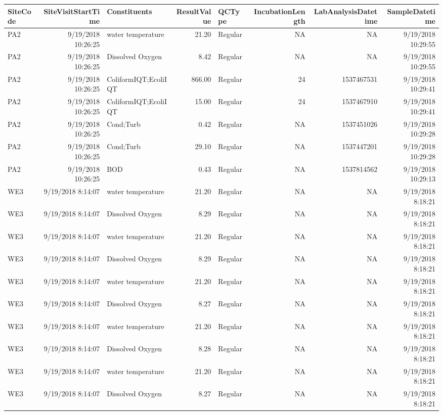 \documentclass[
  letterpaper,
  DIV=11,
  numbers=noendperiod]{scrartcl}
\begin{document}
\begin{longtable*}{lrlrlrrr}
\toprule
SiteCode & SiteVisitStartTime & Constituents & ResultValue & QCType & IncubationLength & LabAnalysisDatetime & SampleDatetime \\ 
\midrule\addlinespace[2.5pt]
PA2 & 9/19/2018 10:26:25 & water temperature & 21.20 & Regular & NA & NA & 9/19/2018 10:29:55 \\ 
PA2 & 9/19/2018 10:26:25 & Dissolved Oxygen & 8.42 & Regular & NA & NA & 9/19/2018 10:29:55 \\ 
PA2 & 9/19/2018 10:26:25 & ColiformIQT;EcoliIQT & 866.00 & Regular & 24 & 1537467531 & 9/19/2018 10:29:41 \\ 
PA2 & 9/19/2018 10:26:25 & ColiformIQT;EcoliIQT & 15.00 & Regular & 24 & 1537467910 & 9/19/2018 10:29:41 \\ 
PA2 & 9/19/2018 10:26:25 & Cond;Turb & 0.42 & Regular & NA & 1537451026 & 9/19/2018 10:29:28 \\ 
PA2 & 9/19/2018 10:26:25 & Cond;Turb & 29.10 & Regular & NA & 1537447201 & 9/19/2018 10:29:28 \\ 
PA2 & 9/19/2018 10:26:25 & BOD & 0.43 & Regular & NA & 1537814562 & 9/19/2018 10:29:13 \\ 
WE3 & 9/19/2018 8:14:07 & water temperature & 21.20 & Regular & NA & NA & 9/19/2018 8:18:21 \\ 
WE3 & 9/19/2018 8:14:07 & Dissolved Oxygen & 8.29 & Regular & NA & NA & 9/19/2018 8:18:21 \\ 
WE3 & 9/19/2018 8:14:07 & water temperature & 21.20 & Regular & NA & NA & 9/19/2018 8:18:21 \\ 
WE3 & 9/19/2018 8:14:07 & Dissolved Oxygen & 8.29 & Regular & NA & NA & 9/19/2018 8:18:21 \\ 
WE3 & 9/19/2018 8:14:07 & water temperature & 21.20 & Regular & NA & NA & 9/19/2018 8:18:21 \\ 
WE3 & 9/19/2018 8:14:07 & Dissolved Oxygen & 8.27 & Regular & NA & NA & 9/19/2018 8:18:21 \\ 
WE3 & 9/19/2018 8:14:07 & water temperature & 21.20 & Regular & NA & NA & 9/19/2018 8:18:21 \\ 
WE3 & 9/19/2018 8:14:07 & Dissolved Oxygen & 8.28 & Regular & NA & NA & 9/19/2018 8:18:21 \\ 
WE3 & 9/19/2018 8:14:07 & water temperature & 21.20 & Regular & NA & NA & 9/19/2018 8:18:21 \\ 
WE3 & 9/19/2018 8:14:07 & Dissolved Oxygen & 8.27 & Regular & NA & NA & 9/19/2018 8:18:21 \\ 

\end{longtable*}
\end{document}
